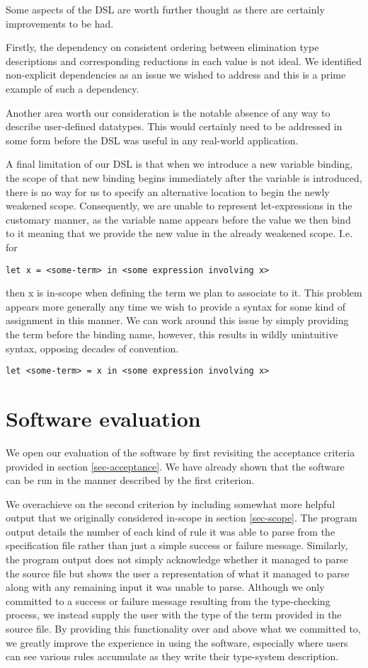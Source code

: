 Some aspects of the DSL are worth further thought as there are
certainly improvements to be had.

Firstly, the dependency on consistent ordering between elimination
type descriptions and corresponding reductions in each value is not
ideal. We identified non-explicit dependencies as an issue we wished to
address and this is a prime example of such a dependency.

Another area worth our consideration is the notable absence of any way to
describe user-defined datatypes. This would certainly need to be addressed
in some form before the DSL was useful in any real-world application.

A final limitation of our DSL is that when we introduce a new variable
binding, the scope of that new binding begins immediately after the
variable is introduced, there is no way for us to specify an
alternative location to begin the newly weakened scope. Consequently,
we are unable to represent let-expressions in the customary manner, as
the variable name appears before the value we then bind to it meaning
that we provide the new value in the already weakened scope. I.e. for
\begin{verbatim}
let x = <some-term> in <some expression involving x>
\end{verbatim}
then x is in-scope when defining the term we plan to associate to
it. This problem appears more generally any time we wish to provide a
syntax for some kind of assignment in this manner. We can work around
this issue by simply providing the term before the binding name,
however, this results in wildly unintuitive syntax, opposing decades of
convention.
\begin{verbatim}
let <some-term> = x in <some expression involving x>
\end{verbatim}

\section{Software evaluation}

We open our evaluation of the software by first revisiting the
acceptance criteria provided in section \ref{sec-acceptance}. We have
already shown that the software can be run in the manner described by
the first criterion.

We overachieve on the second criterion by including somewhat more
helpful output that we originally considered in-scope in section
\ref{sec-scope}. The program output details the number of each kind of
rule it was able to parse from the specification file rather than just
a simple success or failure message. Similarly, the program output does
not simply acknowledge whether it managed to parse the source file
but shows the user a representation of what it managed to parse along
with any remaining input it was unable to parse. Although we
only committed to a success or failure message resulting from the
type-checking process, we instead supply the user with the type of the
term provided in the source file. By providing this functionality over
and above what we committed to, we greatly improve the experience in
using the software, especially where users can see various
rules accumulate as they write their type-system description.

